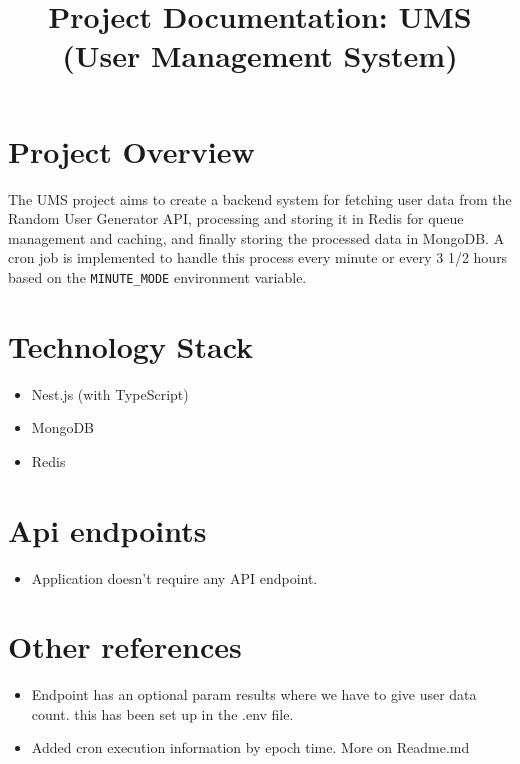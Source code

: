 \documentclass{article}
\title{Project Documentation: UMS (User Management System)}
\author{}
\date{}
\begin{document}
	\maketitle
	
	\section*{Project Overview}
	The UMS project aims to create a backend system for fetching user data from the Random User Generator API, processing and storing it in Redis for queue management and caching, and finally storing the processed data in MongoDB. A cron job is implemented to handle this process every minute or every 3 1/2 hours based on the \texttt{MINUTE\_MODE} environment variable.
	
	\section*{Technology Stack}
	\begin{itemize}[label=-]
		\item Nest.js (with TypeScript)
		\item MongoDB
		\item Redis
	\end{itemize}
	
	\section*{Api endpoints}
	\begin{itemize}[label=-]
		\item Application doesn't require any API endpoint.
	\end{itemize}


	\section*{Other references}
	\begin{itemize}[label=-]
		\item Endpoint has an optional param results where we have to give user data count. this has been set up in the .env file.
		\item Added cron execution information by epoch time. More on Readme.md 
	\end{itemize}
	
\end{document}
